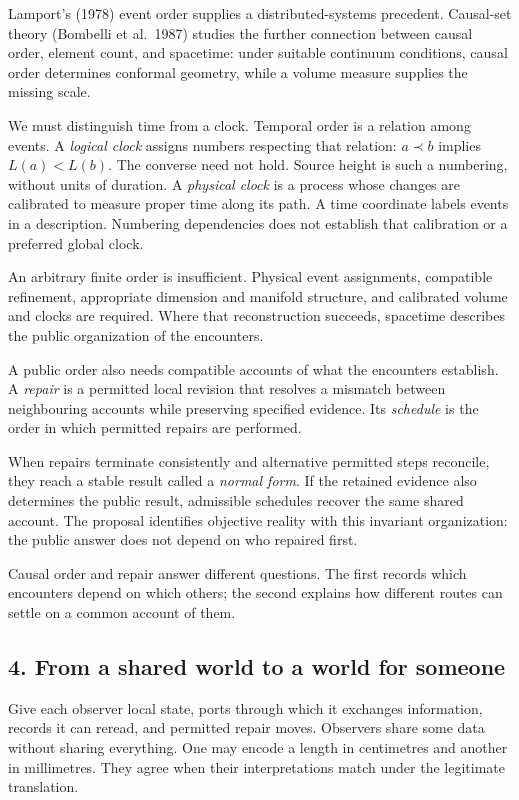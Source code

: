 \documentclass[
  11pt,
]{article}
\begin{document}
Lamport's (1978) event order supplies a distributed-systems precedent.
Causal-set theory (Bombelli et al.~1987) studies the further connection
between causal order, element count, and spacetime: under suitable
continuum conditions, causal order determines conformal geometry, while
a volume measure supplies the missing scale.

We must distinguish time from a clock. Temporal order is a relation
among events. A \emph{logical clock} assigns numbers respecting that
relation: \(a\prec b\) implies \(L(a)<L(b)\). The converse need not
hold. Source height is such a numbering, without units of duration. A
\emph{physical clock} is a process whose changes are calibrated to
measure proper time along its path. A time coordinate labels events in a
description. Numbering dependencies does not establish that calibration
or a preferred global clock.

An arbitrary finite order is insufficient. Physical event assignments,
compatible refinement, appropriate dimension and manifold structure, and
calibrated volume and clocks are required. Where that reconstruction
succeeds, spacetime describes the public organization of the encounters.

A public order also needs compatible accounts of what the encounters
establish. A \emph{repair} is a permitted local revision that resolves a
mismatch between neighbouring accounts while preserving specified
evidence. Its \emph{schedule} is the order in which permitted repairs
are performed.

When repairs terminate consistently and alternative permitted steps
reconcile, they reach a stable result called a \emph{normal form}. If
the retained evidence also determines the public result, admissible
schedules recover the same shared account. The proposal identifies
objective reality with this invariant organization: the public answer
does not depend on who repaired first.

Causal order and repair answer different questions. The first records
which encounters depend on which others; the second explains how
different routes can settle on a common account of them.

\subsection{4. From a shared world to a world for
someone}\label{from-a-shared-world-to-a-world-for-someone}

Give each observer local state, ports through which it exchanges
information, records it can reread, and permitted repair moves.
Observers share some data without sharing everything. One may encode a
length in centimetres and another in millimetres. They agree when their
interpretations match under the legitimate translation.
\end{document}
